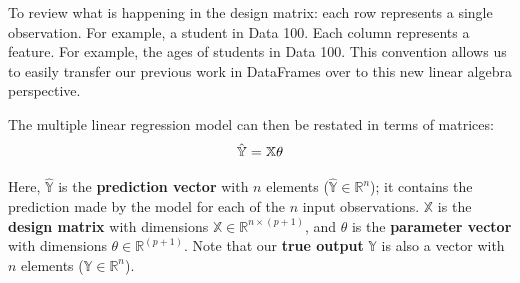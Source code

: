 \documentclass[
  letterpaper,
  DIV=11,
  numbers=noendperiod]{scrreprt}
\begin{document}
To review what is happening in the design matrix: each row represents a
single observation. For example, a student in Data 100. Each column
represents a feature. For example, the ages of students in Data 100.
This convention allows us to easily transfer our previous work in
DataFrames over to this new linear algebra perspective.

The multiple linear regression model can then be restated in terms of
matrices: \[
\Large
\mathbb{\hat{Y}} = \mathbb{X} \theta
\]

Here, \(\mathbb{\hat{Y}}\) is the \textbf{prediction vector} with \(n\)
elements (\(\mathbb{\hat{Y}} \in \mathbb{R}^{n}\)); it contains the
prediction made by the model for each of the \(n\) input observations.
\(\mathbb{X}\) is the \textbf{design matrix} with dimensions
\(\mathbb{X} \in \mathbb{R}^{n \times (p + 1)}\), and \(\theta\) is the
\textbf{parameter vector} with dimensions
\(\theta \in \mathbb{R}^{(p + 1)}\). Note that our \textbf{true output}
\(\mathbb{Y}\) is also a vector with \(n\) elements
(\(\mathbb{Y} \in \mathbb{R}^{n}\)).
\end{document}
